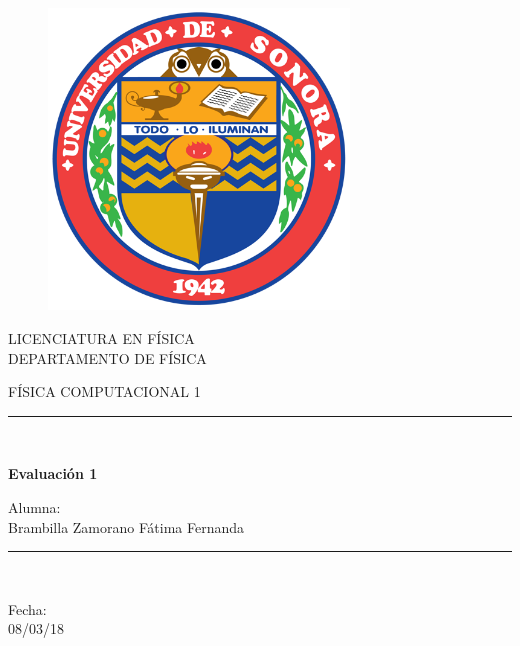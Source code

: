 \documentclass{article}
\begin{document}
\begin{titlepage}
\begin{center}
    \vspace*{-1in}
    \begin{figure}[htb]
    \begin{center}
    \includegraphics[width=8cm]{escudo-gde-trans.png}
    \end{center}
\end{figure}    
\begin{center}
LICENCIATURA EN FÍSICA \\
\vspace*{0.15in}
DEPARTAMENTO DE FÍSICA \\
\vspace*{0.6in}
\begin{large}
FÍSICA COMPUTACIONAL 1 \\
\end{large}
\vspace*{0.2in}
\rule{80mm}{0.1mm}\\
\vspace*{0.1in}
\begin{large}
\textbf{Evaluación 1\\ }
\end{large}
\vspace*{0.3in}
\begin{large}
Alumna: \\
\vspace*{0.1in}
Brambilla Zamorano Fátima Fernanda\\
\end{large}
\vspace*{0.3in}
\rule{80mm}{0.1mm}\\
\vspace*{0.1in}
\begin{large}
Fecha: \\ 08/03/18\\
\end{large}
\end{center}
\end{center}
\end{titlepage}
\end{document}
